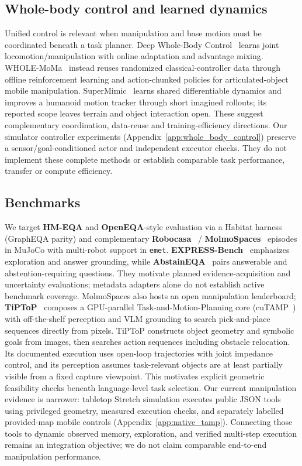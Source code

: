 \subsection{Whole-body control and learned dynamics}

Unified control is relevant when manipulation and base motion must be
coordinated beneath a task planner. Deep Whole-Body Control~\citep{fu2023deepwholebody}
learns joint locomotion/manipulation with online adaptation and advantage
mixing. WHOLE-MoMa~\citep{jauhri2026wholemoma} instead reuses randomized
classical-controller data through offline reinforcement learning and
action-chunked policies for articulated-object mobile manipulation.
SuperMimic~\citep{liao2026supermimic} learns shared differentiable dynamics and
improves a humanoid motion tracker through short imagined rollouts; its reported
scope leaves terrain and object interaction open.
These suggest complementary coordination, data-reuse and training-efficiency
directions. Our simulator controller experiments (Appendix~\ref{app:whole_body_control})
preserve a sensor/goal-conditioned actor and independent executor checks.
They do not implement these complete methods or establish comparable task
performance, transfer or compute efficiency.

\subsection{Benchmarks}

We target \textbf{HM-EQA} and \textbf{OpenEQA}-style evaluation via a Habitat harness (GraphEQA parity) and complementary \textbf{Robocasa}~\citep{robocasa365} / \textbf{MolmoSpaces}~\citep{molmospaces2026} episodes in MuJoCo with multi-robot support in \texttt{emet}.
\textbf{EXPRESS-Bench}~\citep{jiang2025express} emphasizes exploration and answer grounding, while \textbf{AbstainEQA}~\citep{wu2026abstaineqa} pairs answerable and abstention-requiring questions.
They motivate planned evidence-acquisition and uncertainty evaluations; metadata adapters alone do not establish active benchmark coverage.
MolmoSpaces also hosts an open manipulation leaderboard; \textbf{TiPToP}~\citep{shen2026tiptop} composes a GPU-parallel Task-and-Motion-Planning core (cuTAMP~\citep{shen2024cutamp}) with off-the-shelf perception and VLM grounding to search pick-and-place sequences directly from pixels.
TiPToP constructs object geometry and symbolic goals from images, then searches action sequences including obstacle relocation.
Its documented execution uses open-loop trajectories with joint impedance control, and its perception assumes task-relevant objects are at least partially visible from a fixed capture viewpoint.
This motivates explicit geometric feasibility checks beneath language-level task selection.
Our current manipulation evidence is narrower: tabletop Stretch simulation executes public JSON tools using privileged geometry, measured execution checks, and separately labelled provided-map mobile controls (Appendix~\ref{app:native_tamp}).
Connecting those tools to dynamic observed memory, exploration, and verified multi-step execution remains an integration objective; we do not claim comparable end-to-end manipulation performance.


